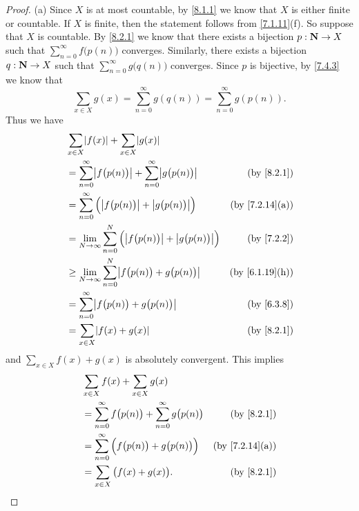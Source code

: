 \begin{proof}{(a)}
  Since \(X\) is at most countable, by \cref{8.1.1} we know that \(X\) is either finite or countable.
  If \(X\) is finite, then the statement follows from \cref{7.1.11}(f).
  So suppose that \(X\) is countable.
  By \cref{8.2.1} we know that there exists a bijection \(p : \mathbf{N} \to X\) such that \(\sum_{n = 0}^\infty f\big(p(n)\big)\) converges.
  Similarly, there exists a bijection \(q : \mathbf{N} \to X\) such that \(\sum_{n = 0}^\infty g\big(q(n)\big)\) converges.
  Since \(p\) is bijective, by \cref{7.4.3} we know that
  \[
    \sum_{x \in X} g(x) = \sum_{n = 0}^\infty g(q(n)) = \sum_{n = 0}^\infty g(p(n)).
  \]
  Thus we have
  \begin{align*}
     & \sum_{x \in X} \abs{f(x)} + \sum_{x \in X} \abs{g(x)}                                                                       \\
     & = \sum_{n = 0}^\infty \abs{f\big(p(n)\big)} + \sum_{n = 0}^\infty \abs{g\big(p(n)\big)}      & \text{(by \cref{8.2.1})}     \\
     & = \sum_{n = 0}^\infty \Big(\abs{f\big(p(n)\big)} + \abs{g\big(p(n)\big)}\Big)                & \text{(by \cref{7.2.14}(a))} \\
     & = \lim_{N \to \infty} \sum_{n = 0}^N \Big(\abs{f\big(p(n)\big)} + \abs{g\big(p(n)\big)}\Big) & \text{(by \cref{7.2.2})}     \\
     & \geq \lim_{N \to \infty} \sum_{n = 0}^N \abs{f\big(p(n)\big) + g\big(p(n)\big)}              & \text{(by \cref{6.1.19}(h))} \\
     & = \sum_{n = 0}^\infty \abs{f\big(p(n)\big) + g\big(p(n)\big)}                                & \text{(by \cref{6.3.8})}     \\
     & = \sum_{x \in X} \abs{f(x) + g(x)}                                                           & \text{(by \cref{8.2.1})}
  \end{align*}
  and \(\sum_{x \in X} f(x) + g(x)\) is absolutely convergent.
  This implies
  \begin{align*}
     & \sum_{x \in X} f(x) + \sum_{x \in X} g(x)                                                                  \\
     & = \sum_{n = 0}^\infty f\big(p(n)\big) + \sum_{n = 0}^\infty g\big(p(n)\big) & \text{(by \cref{8.2.1})}     \\
     & = \sum_{n = 0}^\infty \Big(f\big(p(n)\big) + g\big(p(n)\big)\Big)           & \text{(by \cref{7.2.14}(a))} \\
     & = \sum_{x \in X} \big(f(x) + g(x)\big).                                     & \text{(by \cref{8.2.1})}
  \end{align*}
\end{proof}

